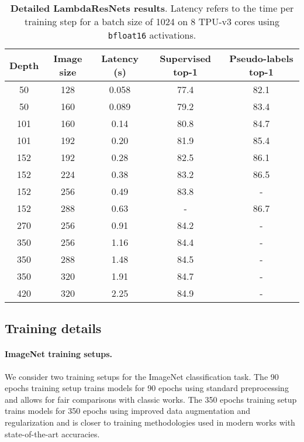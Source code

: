\documentclass{article} \usepackage{iclr2021_conference,times}
\begin{document}
\begin{table}[h!]
\begin{center}
    \begin{tabular}{ccc|cc}
    \toprule
    Depth & Image size & Latency (s) & Supervised top-1 & Pseudo-labels top-1 \\
    \midrule
    50 & 128 & 0.058 & 77.4 & 82.1 \\
    50 & 160 & 0.089 & 79.2 & 83.4 \\
    101 & 160 & 0.14 & 80.8 & 84.7 \\
    101 & 192 & 0.20 & 81.9 & 85.4 \\
    152 & 192 & 0.28 & 82.5 & 86.1 \\
    152 & 224 & 0.38 & 83.2 & 86.5 \\
    152 & 256 & 0.49 & 83.8 & - \\
    152 & 288 & 0.63 & - & 86.7 \\
    270 & 256 & 0.91 & 84.2 & - \\
    350 & 256 & 1.16 & 84.4 & - \\
    350 & 288 & 1.48 & 84.5 & - \\
    350 & 320 & 1.91 & 84.7 & - \\
    420 & 320 & 2.25 & 84.9 & - \\
    \bottomrule
    \end{tabular}
\end{center}
\caption{
\textbf{Detailed LambdaResNets results}.
Latency refers to the time per training step for a batch size of 1024 on 8 TPU-v3 cores using \texttt{bfloat16} activations.
}
\label{tab:pareto_curve_details} 
\end{table}

\subsection{Training details\label{sec:training_details}}

\vspace{-0.1cm}
\paragraph{ImageNet training setups.}
We consider two training setups for the ImageNet classification task.
The 90 epochs training setup trains models for 90 epochs using standard preprocessing and allows for fair comparisons with classic works.
The 350 epochs training setup trains models for 350 epochs using improved data augmentation and regularization
and is closer to training methodologies used in modern works with state-of-the-art accuracies.
\end{document}
